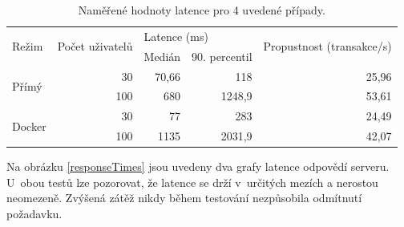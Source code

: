 \begin{table}[]
\centering
\begin{tabular}{|l|r|rr|r|}
\hline
\multirow{2}{*}{Režim}  & \multicolumn{1}{l|}{\multirow{2}{*}{Počet uživatelů}} & \multicolumn{2}{l|}{Latence (ms)}                                & \multicolumn{1}{l|}{\multirow{2}{*}{Propustnost (transakce/s)}} \\ \cline{3-4}
                        & \multicolumn{1}{l|}{}                                 & \multicolumn{1}{l|}{Medián} & \multicolumn{1}{l|}{90. percentil} & \multicolumn{1}{l|}{}                                   \\ \hline
\multirow{2}{*}{Přímý}  & 30                                                    & \multicolumn{1}{r|}{70,66}  & 118                                & 25,96                                                   \\ \cline{2-5} 
                        & 100                                                   & \multicolumn{1}{r|}{680}    & 1248,9                             & 53,61                                                   \\ \hline
\multirow{2}{*}{Docker} & 30                                                    & \multicolumn{1}{r|}{77}     & 283                                & 24,49                                                   \\ \cline{2-5} 
                        & 100                                                   & \multicolumn{1}{r|}{1135}   & 2031,9                             & 42,07                                                   \\ \hline
\end{tabular}
\caption{Naměřené hodnoty latence pro 4 uvedené případy.}
\label{apachePerfDataTable}
\end{table}

Na obrázku \ref{responseTimes} jsou uvedeny dva grafy latence odpovědí serveru.
U~obou testů lze pozorovat, že latence se drží v~určitých mezích a nerostou neomezeně.
Zvýšená zátěž nikdy během testování nezpůsobila odmítnutí požadavku.


